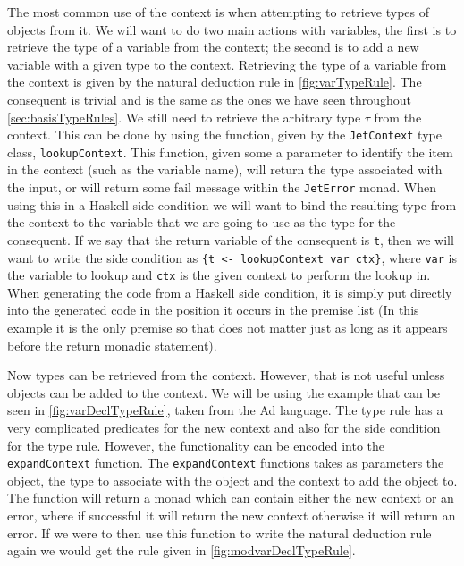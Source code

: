 The most common use of the context is when attempting to retrieve types of objects from it.
We will want to do two main actions with variables, the first is to retrieve the type of a variable from the context; the second is to add a new variable with a given type to the context.
Retrieving the type of a variable from the context is given by the natural deduction rule in \autoref{fig:varTypeRule}.
The consequent is trivial and is the same as the ones we have seen throughout \autoref{sec:basisTypeRules}.
We still need to retrieve the arbitrary type $\tau$ from the context.
This can be done by using the function, given by the \texttt{JetContext} type class, \texttt{lookupContext}.
This function, given some a parameter to identify the item in the context (such as the variable name), will return the type associated with the input, or will return some fail message within the \texttt{JetError} monad.
When using this in a Haskell side condition we will want to bind the resulting type from the context to the variable that we are going to use as the type for the consequent.
If we say that the return variable of the consequent is \texttt{t}, then we will want to write the side condition as \texttt{\{t <- lookupContext var ctx\}}, where \texttt{var} is the variable to lookup and \texttt{ctx} is the given context to perform the lookup in.
When generating the code from a Haskell side condition, it is simply put directly into the generated code in the position it occurs in the premise list (In this example it is the only premise so that does not matter just as long as it appears before the return monadic statement).

Now types can be retrieved from the context.
However, that is not useful unless objects can be added to the context.
We will be using the example that can be seen in \autoref{fig:varDeclTypeRule}, taken from the Ad language.
The type rule has a very complicated predicates for the new context and also for the side condition for the type rule.
However, the functionality can be encoded into the \texttt{expandContext} function.
The \texttt{expandContext} functions takes as parameters the object, the type to associate with the object and the context to add the object to.
The function will return a monad which can contain either the new context or an error, where if successful it will return the new context otherwise it will return an error.
If we were to then use this function to write the natural deduction rule again we would get the rule given in \autoref{fig:modvarDeclTypeRule}.


